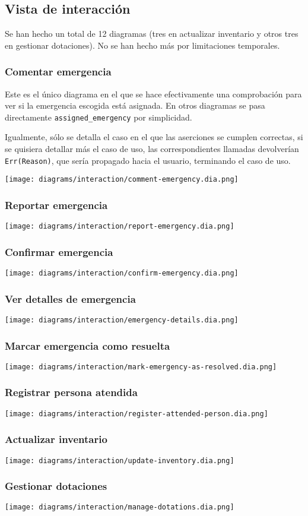 \subsection{Vista de interacción}
Se han hecho un total de 12 diagramas (tres en actualizar inventario y otros tres en gestionar dotaciones). No se han hecho más por limitaciones temporales.

\subsubsection{Comentar emergencia}
Este es el único diagrama en el que se hace efectivamente una comprobación para ver si la emergencia escogida está asignada. En otros diagramas se pasa directamente \texttt{assigned\_emergency} por simplicidad.

Igualmente, sólo se detalla el caso en el que las aserciones se cumplen correctas, si se quisiera detallar más el caso de uso, las correspondientes llamadas devolverían \texttt{Err(Reason)}, que sería propagado hacia el usuario, terminando el caso de uso.

\texttt{[image: diagrams/interaction/comment-emergency.dia.png]}

\subsubsection{Reportar emergencia}
\texttt{[image: diagrams/interaction/report-emergency.dia.png]}

\subsubsection{Confirmar emergencia}
\texttt{[image: diagrams/interaction/confirm-emergency.dia.png]}

\subsubsection{Ver detalles de emergencia}
\texttt{[image: diagrams/interaction/emergency-details.dia.png]}

\subsubsection{Marcar emergencia como resuelta}
\texttt{[image: diagrams/interaction/mark-emergency-as-resolved.dia.png]}

\subsubsection{Registrar persona atendida}
\texttt{[image: diagrams/interaction/register-attended-person.dia.png]}

\subsubsection{Actualizar inventario}
\texttt{[image: diagrams/interaction/update-inventory.dia.png]}

\subsubsection{Gestionar dotaciones}
\texttt{[image: diagrams/interaction/manage-dotations.dia.png]}

